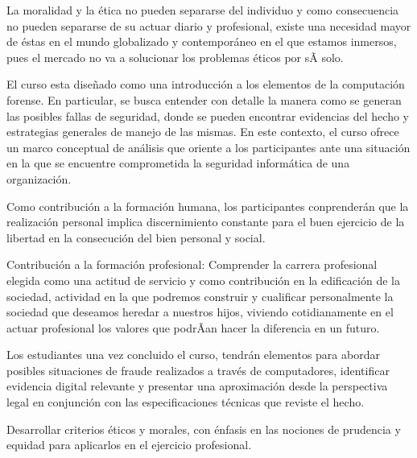 \begin{syllabus}


\begin{justification}
La moralidad y la ética no pueden separarse del individuo y como consecuencia
no pueden separarse de su actuar diario y profesional, existe una necesidad 
mayor de éstas en el mundo globalizado y contemporáneo en el que estamos inmersos, 
pues el mercado no va a solucionar los problemas éticos por sÃ­ solo.

El curso esta diseñado como una introducción a los elementos de la computación forense. 
En particular, se busca entender con detalle la manera como se generan las posibles 
fallas de seguridad, donde se pueden encontrar evidencias del hecho y estrategias 
generales de manejo de las mismas. En este contexto, el curso ofrece un marco 
conceptual de análisis que oriente a los participantes ante una situación en la 
que se encuentre comprometida la seguridad informática de una organización.

Como contribución a la formación humana, los participantes conprenderán que la 
realización personal implica discernimiento constante para el buen ejercicio 
de la libertad en la consecución del bien personal y social.

Contribución a la formación profesional: Comprender la carrera profesional 
elegida como una actitud de servicio y como contribución en la edificación 
de la sociedad, actividad en la que podremos construir y cualificar personalmente 
la sociedad que deseamos heredar a nuestros hijos, viviendo cotidianamente 
en el actuar profesional los valores que podrÃ­an hacer la diferencia en un futuro.

Los estudiantes una vez concluido el curso, tendrán elementos para abordar 
posibles situaciones de fraude realizados a través de computadores, 
identificar evidencia digital relevante y presentar una aproximación desde la 
perspectiva legal en conjunción con las especificaciones técnicas que reviste 
el hecho.
\end{justification}

\begin{goals}
\item Desarrollar criterios éticos y morales, con énfasis en las nociones de prudencia y equidad para aplicarlos en el ejercicio profesional.
\end{goals}

\begin{outcomes}
\end{outcomes}


\end{syllabus}
